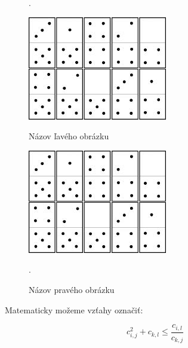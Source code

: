 \begin{figure}[ht]
\phantom.\hfill
%
\begin{minipage}{0.4\linewidth}
\begin{center}
\includegraphics[width=.8\textwidth]{domino.jpg}
\caption{Názov ľavého obrázku}
\label{obrL1}
\end{center}
\end{minipage}
%
\hfill
%
\begin{minipage}{0.4\linewidth}
\begin{center}
\includegraphics[width=.8\textwidth]{domino.jpg}
\caption{Názov pravého obrázku}
\label{obrP1}
\end{center}
\end{minipage}
%
\hfill\phantom.
\end{figure}



Matematicky možeme vzťahy označiť:

\begin{equation} 
\label{nerov1}
c_{i,j}^2+c_{k,l} \le \frac{c_{i,l}}{c_{k,j}}
\end{equation}

